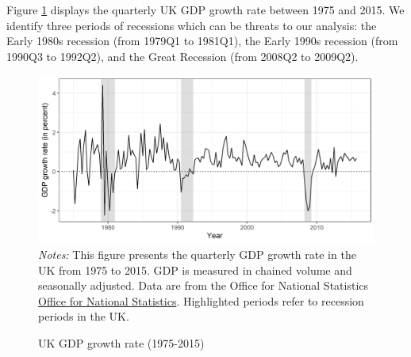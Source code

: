 Figure \ref{chap2-fig:gdp-growth} displays the quarterly UK GDP growth rate between 1975 and 2015. We identify three periods of recessions which can be threats to our analysis: the Early 1980s recession (from 1979Q1 to 1981Q1), the Early 1990s recession (from 1990Q3 to 1992Q2), and the Great Recession (from 2008Q2 to 2009Q2). 
\begin{figure}[!htb]
    \centering
    \caption{UK GDP growth rate (1975-2015)}
    \label{chap2-fig:gdp-growth}
    \includegraphics[width=\linewidth]{chap2/graphic/gdp-growth.png}
    \vspace{-3em}
	\justify\singlespacing\footnotesize{\textit{Notes:} This figure presents the quarterly GDP growth rate in the UK from 1975 to 2015. GDP is measured in chained volume and seasonally adjusted. Data are from the Office for National Statistics \href{https://www.ons.gov.uk/economy/grossdomesticproductgdp/timeseries/abmi/pn2}{Office for National Statistics}. Highlighted periods refer to recession periods in the UK.}
\end{figure}

